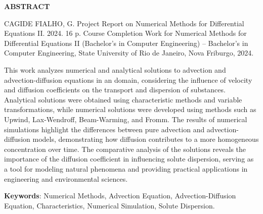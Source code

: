 \begin{titlepage}
    \thispagestyle{empty} %

    \begin{center}
        \textbf{\Large ABSTRACT}
    \end{center}

    \vspace{1cm} %

    \noindent CAGIDE FIALHO, G. Project Report on Numerical Methods for Differential Equations II. 2024. 16 p. Course Completion Work for Numerical Methods for Differential Equations II (Bachelor’s in Computer Engineering) – Bachelor’s in Computer Engineering, State University of Rio de Janeiro, Nova Friburgo, 2024.

    \vspace{0.4cm} %

    This work analyzes numerical and analytical solutions to advection and advection-diffusion equations in an domain, considering the influence of velocity and diffusion coefficients on the transport and dispersion of substances. Analytical solutions were obtained using characteristic methods and variable transformations, while numerical solutions were developed using methods such as Upwind, Lax-Wendroff, Beam-Warming, and Fromm. The results of numerical simulations highlight the differences between pure advection and advection-diffusion models, demonstrating how diffusion contributes to a more homogeneous concentration over time. The comparative analysis of the solutions reveals the importance of the diffusion coefficient in influencing solute dispersion, serving as a tool for modeling natural phenomena and providing practical applications in engineering and environmental sciences.

    \vspace{0.4cm} %

    \textbf{Keywords}: Numerical Methods, Advection Equation, Advection-Diffusion Equation, Characteristics, Numerical Simulation, Solute Dispersion.
\end{titlepage}
